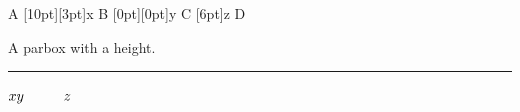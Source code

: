 \documentclass{article}
\begin{document}
A \raisebox{2pt}[10pt][3pt]{x} B \raisebox{0pt}[0pt][0pt]{y} C \raisebox{3pt}[6pt]{z} D 

\parbox[t][3cm]{4cm}{A parbox with a height.}  \rule[-1pt]{1cm}{2pt}

$x\rule[-1ex]{0pt}{3ex}y\vphantom{\int}\hspace{1cm}z$
\end{document}
